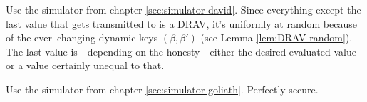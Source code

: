 
Use the simulator from chapter \ref{sec:simulator-david}. Since everything
except the last value that gets transmitted to \JWpTwo{} is a DRAV, it's
uniformly at random because of the ever--changing dynamic keys $(\beta, \beta')$
(see Lemma \ref{lem:DRAV-random}). The last value is---depending on the
honesty---either the desired evaluated value or a value certainly unequal to
that.


Use the simulator from chapter \ref{sec:simulator-goliath}. Perfectly secure.

